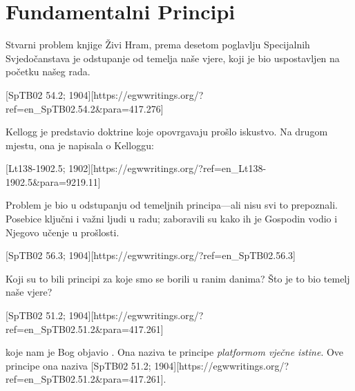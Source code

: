 \chapter{Fundamentalni Principi}

Stvarni problem knjige Živi Hram, prema desetom poglavlju Specijalnih Svjedočanstava je odstupanje od temelja naše vjere, koji je bio uspostavljen na početku našeg rada.

[SpTB02 54.2; 1904][https://egwwritings.org/?ref=en\_SpTB02.54.2&para=417.276]

Kellogg je predstavio doktrine koje opovrgavaju prošlo iskustvo. Na drugom mjestu, ona je napisala o Kelloggu:

[Lt138-1902.5; 1902][https://egwwritings.org/?ref=en\_Lt138-1902.5&para=9219.11]

Problem je bio u odstupanju od temeljnih principa—ali nisu svi to prepoznali. Posebice ključni i važni ljudi u radu; zaboravili su kako ih je Gospodin vodio i Njegovo učenje u prošlosti.

[SpTB02 56.3; 1904][https://egwwritings.org/?ref=en\_SpTB02.56.3]

Koji su to bili principi za koje smo se borili u ranim danima? Što je to bio temelj naše vjere?

[SpTB02 51.2; 1904][https://egwwritings.org/?ref=en\_SpTB02.51.2&para=417.261]

 koje nam je Bog objavio . Ona naziva te principe \textit{platformom vječne istine}. Ove principe ona naziva [SpTB02 51.2; 1904][https://egwwritings.org/?ref=en\_SpTB02.51.2&para=417.261].

